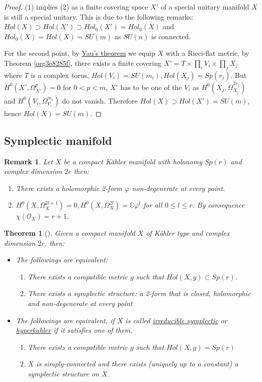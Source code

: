 \documentclass[11pt]{article}
\newtheorem{remark}{Remark}
\newtheorem{theorem}{Theorem}
\begin{document}
\begin{proof}
(1) implies (2) as a finite covering space \(X'\) of a special unitary manifold \(X\) is still a special
unitary. This is due to the following remarks: \(Hol(X)\supset Hol(X')\supset Hol_0(X')
= Hol_0(X)\) and \(Hol_0(X) = Hol(X) = SU(m)\) as \(SU(n)\) is connected.

For the second point, by \href{calabi-yau.org}{Yau's theorem} we equip \(X\) with a Ricci-flat metric, by Theorem
\ref{org3e8285f}, there exists a finite covering \(X' = T\times \prod_i V_i\times \prod_j X_j\) where
\(T\) is a complex torus, \(Hol(V_i) = SU(m_i), Hol(X_j) = Sp(r_j)\). But \(H^0(X',\Omega^p_{X'})=0\) for
\(0<p<m\), \(X'\) has to be one of the \(V_i\) as \(H^0(X_j,\Omega_{X_j}^{2r_j})\) and
\(H^0(V_i,\Omega_{V_i}^{m_i})\) do not vanish. Therefore \(Hol(X) \supset Hol(X') = SU(m)\), hence
\(Hol(X) = SU(m)\).
\end{proof}


\subsection{Symplectic manifold}
\label{sec:org6b0eaef}
\begin{remark}
Let \(X\) be a compact Kähler manifold with holonomy \(Sp(r)\) and complex dimension \(2r\) then:
\begin{enumerate}
\item There exists a holomorphic 2-form \(\varphi\) non-degenerate at every point.
\item \(H^0(X,\Omega_X^{2l+1}) = 0, H^0(X,\Omega_X^{2l})=\mathbb{C}\varphi^l\) for all \(0\leq l\leq
   r\). By consequence \(\chi(\mathcal{O}_X)=r+1\).
\end{enumerate}
\end{remark}

\begin{theorem}[]
Given a compact manifold \(X\) of Kähler type and complex dimension \(2r\), then:
\begin{itemize}
\item The followings are equivalent:
\begin{enumerate}
\item There exists a compatible metric \(g\) such that \(Hol(X,g) \subset Sp(r)\).
\item There exists a symplectic structure: a 2-form that is closed, holomorphic and non-degenerate
at every point
\end{enumerate}
\item The followings are equivalent, if \(X\) is called \uline{irreducible symplectic} or \uline{hyperkahler} if it satisfies one of them.
\begin{enumerate}
\item There exists a compatible metric \(g\) such that \(Hol(X,g) = Sp(r)\)
\item \(X\) is simply-connected and there exists (uniquely up to a constant) a symplectic structure on \(X\).
\end{enumerate}
\end{itemize}
\end{theorem}
\end{document}

